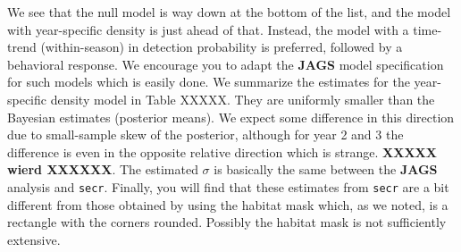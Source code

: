 We see that the null model is way down at the bottom of the list, and
the model with year-specific density is just ahead of that. Instead,
the model with a time-trend (within-season) in detection probability
is preferred, followed by a behavioral response. We encourage you to
adapt the {\bf JAGS} model specification for such models which is easily
done. We summarize the estimates for the year-specific density model
in Table XXXXX. They are uniformly smaller than the Bayesian estimates
(posterior means). We expect some difference in this direction due to
small-sample skew of the posterior, although for year 2 and 3 the
difference is even in the opposite relative direction which is
strange. {\bf XXXXX wierd  XXXXXX}.
The estimated $\sigma$ is basically the same between the {\bf JAGS}
analysis and \mbox{\tt secr}.
Finally, you will find that these estimates from \mbox{\tt secr} 
 are a bit different from those obtained by
using the habitat mask which, 
as we noted, is a rectangle with the corners
rounded. Possibly the habitat mask is not sufficiently extensive. 




